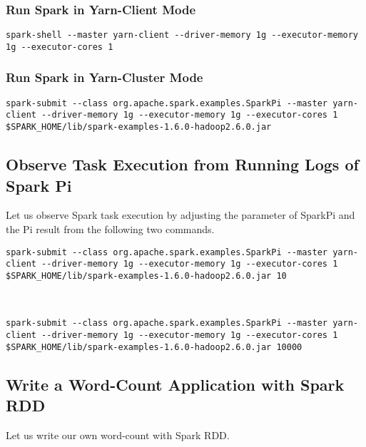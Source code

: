 \subsubsection{Run Spark in Yarn-Client
Mode}\label{run-spark-in-yarn-client-mode}

\begin{lstlisting}
spark-shell --master yarn-client --driver-memory 1g --executor-memory 1g --executor-cores 1
\end{lstlisting}

\subsubsection{Run Spark in Yarn-Cluster
Mode}\label{run-spark-in-yarn-cluster-mode}

\begin{lstlisting}
spark-submit --class org.apache.spark.examples.SparkPi --master yarn-client --driver-memory 1g --executor-memory 1g --executor-cores 1 $SPARK_HOME/lib/spark-examples-1.6.0-hadoop2.6.0.jar
\end{lstlisting}

\subsection{Observe Task Execution from Running Logs of Spark
Pi}\label{observe-task-execution-from-running-logs-of-spark-pi}

Let us observe Spark task execution by adjusting the parameter of
SparkPi and the Pi result from the following two commands.

\begin{lstlisting}
spark-submit --class org.apache.spark.examples.SparkPi --master yarn-client --driver-memory 1g --executor-memory 1g --executor-cores 1 $SPARK_HOME/lib/spark-examples-1.6.0-hadoop2.6.0.jar 10



spark-submit --class org.apache.spark.examples.SparkPi --master yarn-client --driver-memory 1g --executor-memory 1g --executor-cores 1 $SPARK_HOME/lib/spark-examples-1.6.0-hadoop2.6.0.jar 10000
\end{lstlisting}

\subsection{Write a Word-Count Application with Spark
RDD}\label{write-a-word-count-application-with-spark-rdd}

Let us write our own word-count with Spark RDD.

